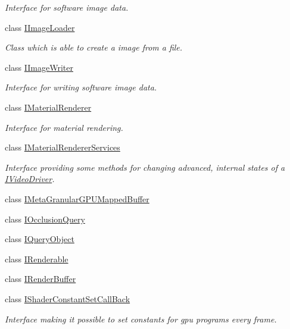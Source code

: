\begin{DoxyCompactItemize}
\begin{DoxyCompactList}\small\item\em Interface for software image data. \end{DoxyCompactList}\item 
class \hyperlink{classirr_1_1video_1_1IImageLoader}{I\+Image\+Loader}
\begin{DoxyCompactList}\small\item\em Class which is able to create a image from a file. \end{DoxyCompactList}\item 
class \hyperlink{classirr_1_1video_1_1IImageWriter}{I\+Image\+Writer}
\begin{DoxyCompactList}\small\item\em Interface for writing software image data. \end{DoxyCompactList}\item 
class \hyperlink{classirr_1_1video_1_1IMaterialRenderer}{I\+Material\+Renderer}
\begin{DoxyCompactList}\small\item\em Interface for material rendering. \end{DoxyCompactList}\item 
class \hyperlink{classirr_1_1video_1_1IMaterialRendererServices}{I\+Material\+Renderer\+Services}
\begin{DoxyCompactList}\small\item\em Interface providing some methods for changing advanced, internal states of a \hyperlink{classirr_1_1video_1_1IVideoDriver}{I\+Video\+Driver}. \end{DoxyCompactList}\item 
class \hyperlink{classirr_1_1video_1_1IMetaGranularGPUMappedBuffer}{I\+Meta\+Granular\+G\+P\+U\+Mapped\+Buffer}
\item 
class \hyperlink{classirr_1_1video_1_1IOcclusionQuery}{I\+Occlusion\+Query}
\item 
class \hyperlink{classirr_1_1video_1_1IQueryObject}{I\+Query\+Object}
\item 
class \hyperlink{classirr_1_1video_1_1IRenderable}{I\+Renderable}
\item 
class \hyperlink{classirr_1_1video_1_1IRenderBuffer}{I\+Render\+Buffer}
\item 
class \hyperlink{classirr_1_1video_1_1IShaderConstantSetCallBack}{I\+Shader\+Constant\+Set\+Call\+Back}
\begin{DoxyCompactList}\small\item\em Interface making it possible to set constants for gpu programs every frame. \end{DoxyCompactList}\item 

\end{DoxyCompactItemize}
